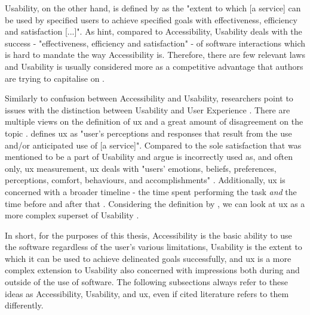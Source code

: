 Usability, on the other hand, is defined by \textcite{ISO_9241-11:2018} as the "extent to which [a service] can be used by specified users to achieve specified goals with effectiveness, efficiency and satisfaction [...]".
As \textcite{Wegge_Zimmermann_2007} hint, compared to Accessibility, Usability deals with the success - "effectiveness, efficiency and satisfaction" \parencite{ISO_9241-11:2018} - of software interactions which is hard to mandate the way Accessibility is.
Therefore, there are few relevant laws and Usability is usually considered more as a competitive advantage that authors are trying to capitalise on \parencite{Wegge_Zimmermann_2007}.

Similarly to confusion between Accessibility and Usability, researchers point to issues with the distinction between Usability and User Experience \parencite{Darin_et_all_2019, Juergen_et_all_2020}.
There are multiple views on the definition of \gls{ux} and a great amount of disagreement on the topic \parencite{Juergen_et_all_2020}.
\textcite{ISO_9241-11:2018} defines \gls{ux} as "user’s perceptions and responses that result from the use and/or anticipated use of [a service]".
Compared to the sole satisfaction that was mentioned to be a part of Usability and \textcite{Darin_et_all_2019} argue is incorrectly used as, and often only, \gls{ux} measurement, \gls{ux} deals with "users’ emotions, beliefs, preferences, perceptions, comfort, behaviours, and accomplishments" \parencite{ISO_9241-11:2018}.
Additionally, \gls{ux} is concerned with a broader timeline - the time spent performing the task \emph{and} the time before and after that \parencite{Juergen_et_all_2020,ISO_9241-11:2018}.
Considering the definition by \textcite{ISO_9241-11:2018}, we can look at \gls{ux} as a more complex superset of Usability \parencite{Juergen_et_all_2020}.

In short, for the purposes of this thesis, Accessibility is the basic ability to use the software regardless of the user's various limitations, Usability is the extent to which it can be used to achieve delineated goals successfully, and \gls{ux} is a more complex extension to Usability also concerned with impressions both during and outside of the use of software.
The following subsections always refer to these ideas as Accessibility, Usability, and \gls{ux}, even if cited literature refers to them differently.

